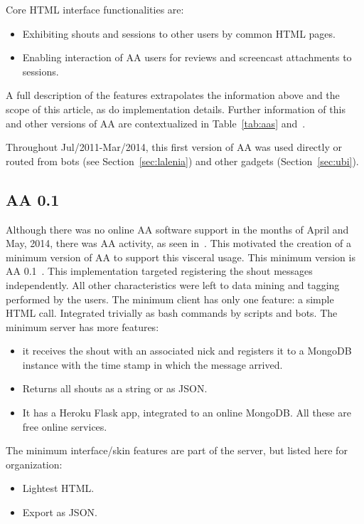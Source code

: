 \documentclass[12pt,fleqn]{article}
\begin{document}
\noindent Core HTML interface functionalities are:
\begin{itemize}
    \item Exhibiting shouts and sessions to other users by common HTML pages.
    \item Enabling interaction of AA users for reviews and screencast attachments to sessions.
\end{itemize}

A full description of the features extrapolates the information above and the scope of this article,
as do implementation details.
Further information of this and other versions of AA are contextualized in Table~\ref{tab:aas} and~\cite{paaper}.

Throughout Jul/2011-Mar/2014, this first version of AA 
was used directly or routed from bots (see Section~\ref{sec:lalenia})
and other gadgets (Section~\ref{sec:ubi}).

\subsection{AA 0.1}\label{sec:aa01}
Although there was no online AA software support in the months of April and May, 2014,
there was AA activity, as seen in~\cite{ensaaio}.
This motivated the creation of a minimum version of AA to support this visceral usage.
This minimum version is AA 0.1~\citep{aa01r}.
This implementation targeted registering the shout messages independently.
All other characteristics were left to data mining and tagging performed by the users.
The minimum client has only one feature:
a simple HTML call. Integrated trivially as bash commands by scripts and bots.
The minimum server has more features:
\begin{itemize}
    \item it receives the shout with an associated nick and registers it to a MongoDB instance with the time stamp in which the message arrived.
    \item Returns all shouts as a string or as JSON.
    \item It has a Heroku Flask app, integrated to an online MongoDB.
	    All these are free online services. 
\end{itemize}
\noindent The minimum interface/skin features are part of the server, but listed here for organization:
\begin{itemize}
    \item Lightest HTML.
    \item Export as JSON.
\end{itemize}
\end{document}
